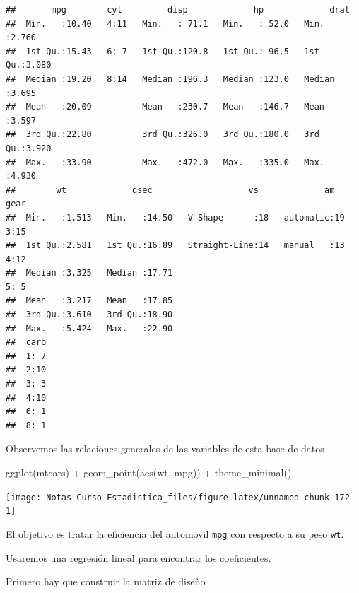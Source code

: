 \documentclass[
  12pt,
]{book}
\newenvironment{Shaded}{\begin{snugshade}}{\end{snugshade}}
\newcommand{\FunctionTok}[1]{\textcolor[rgb]{0.00,0.00,0.00}{#1}}
\newcommand{\NormalTok}[1]{#1}
\newcommand{\OtherTok}[1]{\textcolor[rgb]{0.56,0.35,0.01}{#1}}
\newcommand{\SpecialCharTok}[1]{\textcolor[rgb]{0.00,0.00,0.00}{#1}}
\theoremstyle{definition}
\theoremstyle{definition}
\theoremstyle{definition}
\theoremstyle{remark}
\begin{document}
\begin{verbatim}
##       mpg        cyl         disp             hp             drat      
##  Min.   :10.40   4:11   Min.   : 71.1   Min.   : 52.0   Min.   :2.760  
##  1st Qu.:15.43   6: 7   1st Qu.:120.8   1st Qu.: 96.5   1st Qu.:3.080  
##  Median :19.20   8:14   Median :196.3   Median :123.0   Median :3.695  
##  Mean   :20.09          Mean   :230.7   Mean   :146.7   Mean   :3.597  
##  3rd Qu.:22.80          3rd Qu.:326.0   3rd Qu.:180.0   3rd Qu.:3.920  
##  Max.   :33.90          Max.   :472.0   Max.   :335.0   Max.   :4.930  
##        wt             qsec                   vs             am     gear  
##  Min.   :1.513   Min.   :14.50   V-Shape      :18   automatic:19   3:15  
##  1st Qu.:2.581   1st Qu.:16.89   Straight-Line:14   manual   :13   4:12  
##  Median :3.325   Median :17.71                                     5: 5  
##  Mean   :3.217   Mean   :17.85                                           
##  3rd Qu.:3.610   3rd Qu.:18.90                                           
##  Max.   :5.424   Max.   :22.90                                           
##  carb  
##  1: 7  
##  2:10  
##  3: 3  
##  4:10  
##  6: 1  
##  8: 1
\end{verbatim}

Observemos las relaciones generales de las variables de esta base de datos

\begin{Shaded}
\begin{Highlighting}[]
\FunctionTok{ggplot}\NormalTok{(mtcars) }\SpecialCharTok{+} \FunctionTok{geom\_point}\NormalTok{(}\FunctionTok{aes}\NormalTok{(wt, mpg)) }\SpecialCharTok{+} \FunctionTok{theme\_minimal}\NormalTok{()}
\end{Highlighting}
\end{Shaded}

\begin{center}\texttt{[image: Notas-Curso-Estadistica\_files/figure-latex/unnamed-chunk-172-1]} \end{center}

El objetivo es tratar la eficiencia del automovil \texttt{mpg} con respecto a su peso \texttt{wt}.

Usaremos una regresión lineal para encontrar los coeficientes.

Primero hay que construir la matriz de diseño

\begin{Shaded}
\end{Shaded}
\end{document}
